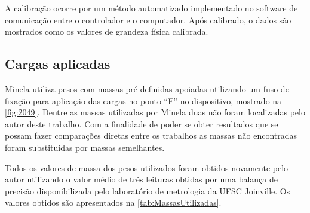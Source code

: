\hfill

A calibração ocorre por um método automatizado implementado no software de comunicação entre o controlador e o computador.
Após calibrado, o dados são mostrados como os valores de grandeza física calibrada.

\subsection{Cargas aplicadas}

Minela utiliza pesos com massas pré definidas apoiadas utilizando um fuso de fixação para aplicação das cargas no ponto “F” no dispositivo, mostrado na \autoref{fig:2049}.
Dentre as massas utilizadas por Minela duas não foram localizadas pelo autor deste trabalho.
Com a finalidade de poder se obter resultados que se possam fazer comparações diretas entre os trabalhos as massas não encontradas foram substituídas por massas semelhantes.

Todos os valores de massa dos pesos utilizados foram obtidos novamente pelo autor utilizando o valor médio de três leituras obtidas por uma balança de precisão disponibilizada
pelo laboratório de metrologia da UFSC Joinville.
Os valores obtidos são apresentados na \autoref{tab:MassasUtilizadas}.

\begin{table}[!ht]
    \caption{Valores de massas utilizadas para aplicação das cargas nos dispositivos de flexão e torção}
    \label{tab:MassasUtilizadas}
    \centering
\end{table}

